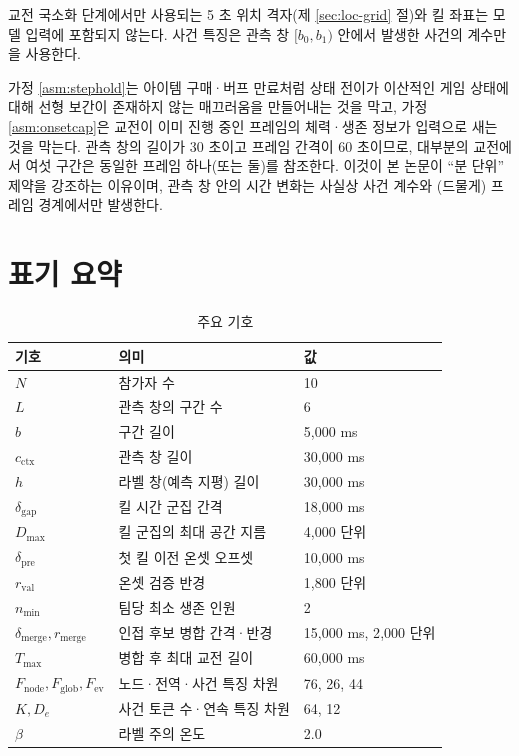 \begin{assumption}[킬 좌표 배제 계약]
\label{asm:nokillpos}
교전 국소화 단계에서만 사용되는 5 초 위치 격자(제 \ref{sec:loc-grid} 절)와 킬 좌표는 모델 입력에 포함되지 않는다. 사건 특징은 관측 창 $[b_0, b_1)$ 안에서 발생한 사건의 계수만을 사용한다.
\end{assumption}

가정 \ref{asm:stephold}는 아이템 구매·버프 만료처럼 상태 전이가 이산적인 게임 상태에 대해 선형 보간이 존재하지 않는 매끄러움을 만들어내는 것을 막고, 가정 \ref{asm:onsetcap}은 교전이 이미 진행 중인 프레임의 체력·생존 정보가 입력으로 새는 것을 막는다. 관측 창의 길이가 30 초이고 프레임 간격이 60 초이므로, 대부분의 교전에서 여섯 구간은 동일한 프레임 하나(또는 둘)를 참조한다. 이것이 본 논문이 ``분 단위'' 제약을 강조하는 이유이며, 관측 창 안의 시간 변화는 사실상 사건 계수와 (드물게) 프레임 경계에서만 발생한다.

\section{표기 요약}
\label{sec:problem-notation}

\begin{table}[H]
  \centering
  \caption{주요 기호}
  \label{tab:notation}
  \small
  \begin{tabular}{@{}lll@{}}
    \toprule
    기호 & 의미 & 값 \\
    \midrule
    $N$ & 참가자 수 & 10 \\
    $L$ & 관측 창의 구간 수 & 6 \\
    $b$ & 구간 길이 & 5{,}000 ms \\
    $c_{\mathrm{ctx}}$ & 관측 창 길이 & 30{,}000 ms \\
    $h$ & 라벨 창(예측 지평) 길이 & 30{,}000 ms \\
    $\delta_{\mathrm{gap}}$ & 킬 시간 군집 간격 & 18{,}000 ms \\
    $D_{\max}$ & 킬 군집의 최대 공간 지름 & 4{,}000 단위 \\
    $\delta_{\mathrm{pre}}$ & 첫 킬 이전 온셋 오프셋 & 10{,}000 ms \\
    $r_{\mathrm{val}}$ & 온셋 검증 반경 & 1{,}800 단위 \\
    $n_{\min}$ & 팀당 최소 생존 인원 & 2 \\
    $\delta_{\mathrm{merge}}, r_{\mathrm{merge}}$ & 인접 후보 병합 간격·반경 & 15{,}000 ms, 2{,}000 단위 \\
    $T_{\max}$ & 병합 후 최대 교전 길이 & 60{,}000 ms \\
    $F_{\mathrm{node}}, F_{\mathrm{glob}}, F_{\mathrm{ev}}$ & 노드·전역·사건 특징 차원 & 76, 26, 44 \\
    $K, D_e$ & 사건 토큰 수·연속 특징 차원 & 64, 12 \\
    $\beta$ & 라벨 주의 온도 & 2.0 \\
    \bottomrule
  \end{tabular}
\end{table}
